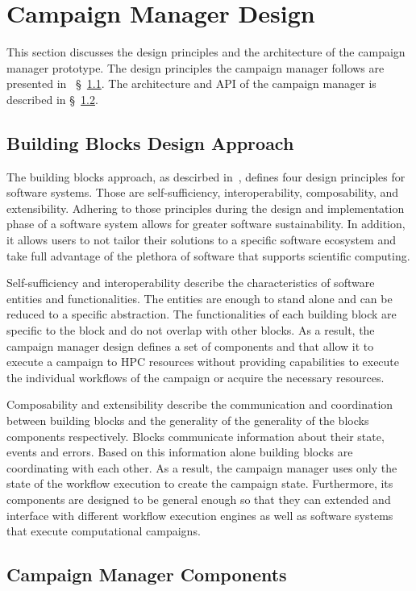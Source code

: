\section{Campaign Manager Design}
This section discusses the design principles and the architecture of the campaign manager prototype.
The design principles the campaign manager follows are presented in ~\S~\ref{ssec:building_blocks}.
The architecture and API of the campaign manager is described in \S~\ref{ssec:cm_arch}.
\subsection{Building Blocks Design Approach}
\label{ssec:building_blocks}
The building blocks approach, as descirbed in~\cite{turilli2019middleware}, defines four design principles for software systems.
Those are self-sufficiency, interoperability, composability, and extensibility.
Adhering to those principles during the design and implementation phase of a software system allows for greater software sustainability.
In addition, it allows users to not tailor their solutions to a specific software ecosystem and take full advantage of the plethora of software that supports scientific computing.

Self-sufficiency and interoperability describe the characteristics of software entities and functionalities.
The entities are enough to stand alone and can be reduced to a specific abstraction.
The functionalities of each building block are specific to the block and do not overlap with other blocks.
As a result, the campaign manager design defines a set of components and that allow it to execute a campaign to HPC resources without providing capabilities to execute the individual workflows of the campaign or acquire the necessary resources.

Composability and extensibility describe the communication and coordination between building blocks and the generality of the generality of the blocks components respectively.
Blocks communicate information about their state, events and errors.
Based on this information alone building blocks are coordinating with each other.
As a result, the campaign manager uses only the state of the workflow execution to create the campaign state.
Furthermore, its components are designed to be general enough so that they can extended and interface with different workflow execution engines as well as software systems that execute computational campaigns.

\subsection{Campaign Manager Components}
\label{ssec:cm_arch}

